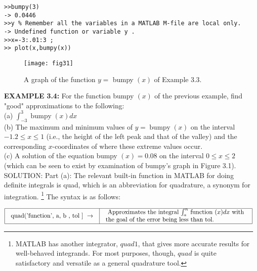 \documentclass[../main.tex]{subfiles}
\begin{document}
\begin{verbatim}
>>bumpy(3) 
-> 0.0446
>>y % Remember all the variables in a MATLAB M-file are local only.
-> Undefined function or variable y . 
>>x=-3:.01:3 ;
>> plot(x,bumpy(x))
\end{verbatim}


\begin{figure}[H]
\centering
\texttt{[image: fig31]}
\caption{A graph of the function $y=$ bumpy $(x)$ of Example 3.3. }
\label{fig:fig_1_5}
\end{figure}


\textbf{EXAMPLE 3.4:} For the function bumpy $(x)$ of the previous example, find "good" approximations to the following:\\

(a) $\int_{-3}^{3} \operatorname{bumpy}(x) d x$\\

(b) The maximum and minimum values of $y=\operatorname{bumpy}(x)$ on the interval $-1.2 \leq x \leq 1$ (i.e., the height of the left peak and that of the valley) and the corresponding $x$-coordinates of where these extreme values occur.\\

(c) A solution of the equation bumpy $(x)=0.08$ on the interval $0 \leq x \leq 2$ (which can be seen to exist by examination of bumpy's graph in Figure 3.1).\\

SOLUTION: Part (a): The relevant built-in function in MATLAB for doing definite integrals is quad, which is an abbreviation for quadrature, a synonym for integration. \footnote{MATLAB has another integrator, $quad1$, that gives more accurate results for well-behaved
integrands. For most purposes, though, $quad$ is quite satisfactory and versatile as a general quadrature
tool. } The syntax is as follows:

$
\begin{array}{|l|l|}
\hline \begin{array}{l}
\text {quad('function', a, b , tol ] } \rightarrow \\
\end{array} & \begin{array}{l}
\text { Approximates the integral $\int_{a}^{n}$ function $(x) d x$ with } \\
\text {the goal of the error being less than tol.}\\
\end{array} \\
\hline
\end{array}
$\\
\end{document}
